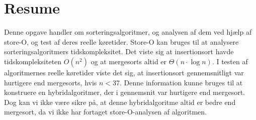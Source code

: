 \chapter*{Resume}
\label{ch:Resume}

Denne opgave handler om sorteringsalgoritmer, og analysen af dem ved hjælp af store-O, og test af deres reelle køretider. Store-O kan bruges til at analysere sorteringsalgoritmers tidskompleksitet. Det viste sig at insertionsort havde tidskompleksiteten $O(n^2)$ og at mergesorts altid er $\Theta (n \cdot \log n)$. I testen af algoritmernes reelle køretider viste det sig, at insertionsort gennemsnitligt var hurtigere end mergesorts, hvis $n < 37$. Denne information kunne bruges til at konstruere en hybridalgoritmer, der i gennemsnit var hurtigere end mergesort. Dog kan vi ikke være sikre på, at denne hybridalgoritme altid er bedre end mergesort, da vi ikke har fortaget store-O-analysen af algoritmen.
